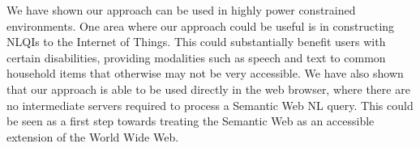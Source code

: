 \documentclass[../main.tex]{subfiles}
\begin{document}
We have shown our approach can be used in highly power constrained environments.
One area where our approach could be useful is in constructing NLQIs to the Internet of Things.
This could substantially benefit users with certain disabilities, providing modalities such as speech and text to common household items that otherwise may not be very accessible.  We have also shown
that our approach is able to be used directly in the web browser, where there are no intermediate servers required to process a Semantic Web NL query.  This could be seen as a first step towards treating the Semantic Web as an accessible extension of the World Wide Web.
\end{document}
